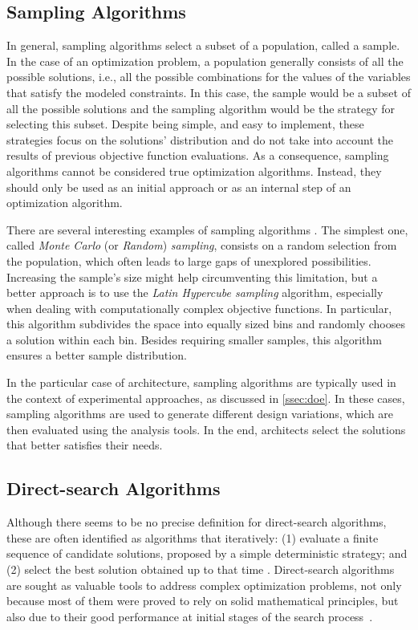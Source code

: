 	\subsection{Sampling Algorithms}
	\label{ssec:sampling}
	In general, sampling algorithms select a subset of a population, called a sample. In the case of an optimization problem, a population generally consists of all the possible solutions, i.e., all the possible combinations for the values of the variables that satisfy the modeled constraints. In this case, the sample would be a subset of all the possible solutions and the sampling algorithm would be the strategy for selecting this subset. Despite being simple, and easy to implement, these strategies focus on the solutions' distribution and do not take into account the results of previous objective function evaluations. As a consequence, sampling algorithms cannot be considered true optimization algorithms. Instead, they should only be used as an initial approach or as an internal step of an optimization algorithm.
	
	There are several interesting examples of sampling algorithms \cite{Tille2006}. The simplest one, called \textit{Monte Carlo} (or \textit{Random}) \textit{sampling}, consists on a random selection from the population, which often leads to large gaps of unexplored possibilities. Increasing the sample's size might help circumventing this limitation, but a better approach is to use the \textit{Latin Hypercube sampling} algorithm, especially when dealing with computationally complex objective functions. In particular, this algorithm subdivides the space into equally sized bins and randomly chooses a solution within each bin. Besides requiring smaller samples, this algorithm ensures a better sample distribution.
	
	In the particular case of architecture, sampling algorithms are typically used in the context of experimental approaches, as discussed in \cref{ssec:doe}. In these cases, sampling algorithms are used to generate different design variations, which are then evaluated using the analysis tools. In the end, architects select the solutions that better satisfies their needs.
	
	\subsection{Direct-search Algorithms}
	\label{ssec:direct-search}
	
	Although there seems to be no precise definition for direct-search algorithms, these are often identified as algorithms that iteratively: (1) evaluate a finite sequence of candidate solutions, proposed by a simple deterministic strategy; and (2) select the best solution obtained up to that time \cite{Conn2009}. Direct-search algorithms are sought as valuable tools to address complex optimization problems, not only because most of them were proved to rely on solid mathematical principles, but also due to their good performance at initial stages of the search process~\cite{Rios2013}. 
	
